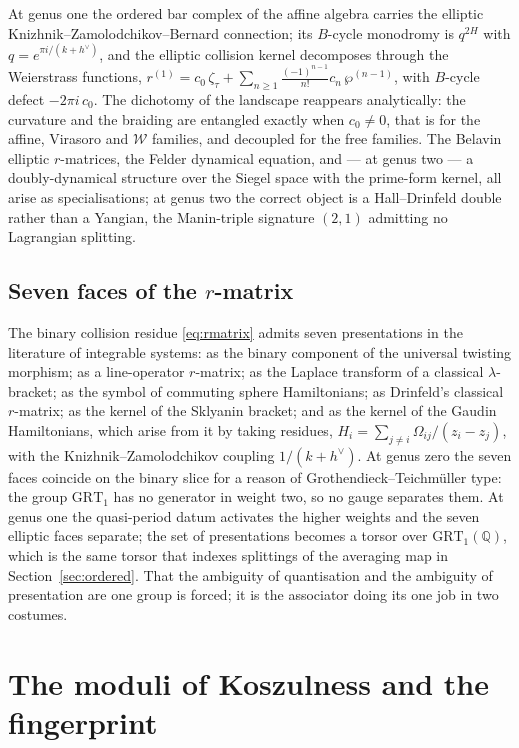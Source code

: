 \documentclass[11pt]{amsart}
\numberwithin{equation}{section}
\theoremstyle{plain}
\theoremstyle{definition}
\theoremstyle{remark}
\newcommand{\cW}{\mathcal{W}}
\newcommand{\bQ}{\mathbb{Q}}
\newcommand{\dvee}{h^{\vee}}
\begin{document}
At genus one the ordered bar complex of the affine algebra carries the
elliptic Knizhnik--Zamolodchikov--Bernard connection; its $B$-cycle
monodromy is $q^{2H}$ with $q=e^{\pi i/(k+\dvee)}$, and the elliptic
collision kernel decomposes through the Weierstrass functions,
$r^{(1)}=c_0\,\zeta_\tau+\sum_{n\geq1}\tfrac{(-1)^{n-1}}{n!}c_n\,
\wp^{(n-1)}$, with $B$-cycle defect $-2\pi i\,c_0$. The dichotomy of
the landscape reappears analytically: the curvature and the braiding
are entangled exactly when $c_0\neq0$, that is for the affine,
Virasoro and $\cW$ families, and decoupled for the free families. The
Belavin elliptic $r$-matrices, the Felder dynamical equation, and ---
at genus two --- a doubly-dynamical structure over the Siegel space
with the prime-form kernel, all arise as specialisations; at genus two
the correct object is a Hall--Drinfeld double rather than a Yangian,
the Manin-triple signature $(2,1)$ admitting no Lagrangian splitting.

\subsection{Seven faces of the $r$-matrix}

The binary collision residue \eqref{eq:rmatrix} admits seven
presentations in the literature of integrable systems: as the binary
component of the universal twisting morphism; as a line-operator
$r$-matrix; as the Laplace transform of a classical
$\lambda$-bracket; as the symbol of commuting sphere Hamiltonians; as
Drinfeld's classical $r$-matrix; as the kernel of the Sklyanin
bracket; and as the kernel of the Gaudin Hamiltonians, which arise
from it by taking residues,
$H_i=\sum_{j\neq i}\Omega_{ij}/(z_i-z_j)$, with the
Knizhnik--Zamolodchikov coupling $1/(k+\dvee)$. At genus zero the
seven faces coincide on the binary slice for a reason of
Grothendieck--Teichm\"uller type: the group $\mathrm{GRT}_1$ has no
generator in weight two, so no gauge separates them. At genus one the
quasi-period datum activates the higher weights and the seven elliptic
faces separate; the set of presentations becomes a torsor over
$\mathrm{GRT}_1(\bQ)$, which is the same torsor that indexes
splittings of the averaging map in Section~\ref{sec:ordered}. That the
ambiguity of quantisation and the ambiguity of presentation are one
group is forced; it is the associator doing its one job in two
costumes.

\section{The moduli of Koszulness and the fingerprint}
\label{sec:moduli}
\end{document}
